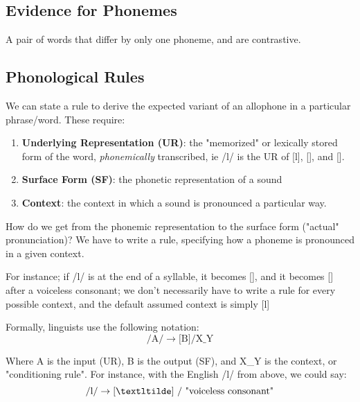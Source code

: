 \documentclass[12pt]{article}
\begin{document}
\subsection{Evidence for Phonemes}
\begin{definitionEnd}
  A pair of words that differ by only one phoneme, and are contrastive.
\end{definitionEnd}

\subsection{Phonological Rules}

We can state a rule to derive the expected variant of an allophone in a particular phrase/word. These require:
\begin{enumerate}
  \item \textbf{Underlying Representation (UR)}: the "memorized" or lexically stored form of the word, \textit{phonemically} transcribed, ie /l/ is the UR of [l], [\textltilde], and [].
  \item \textbf{Surface Form (SF)}: the phonetic representation of a sound
  \item \textbf{Context}: the context in which a sound is pronounced a particular way.
\end{enumerate}

How do we get from the phonemic representation to the surface form ("actual" pronunciation)? We have to write a rule, specifying how a phoneme is pronounced in a given context.

For instance; if /l/ is at the end of a syllable, it becomes [\textltilde], and it becomes [] after a voiceless consonant; we don't necessarily have to write a rule for every possible context, and the default assumed context is simply [l]

Formally, linguists use the following notation:
\[\text{/A/} \rightarrow \text{[B]} / \text{X\_Y}\]

Where A is the input (UR), B is the output (SF), and X\_Y is the context, or "conditioning rule". For instance, with the English /l/ from above, we could say:
\[\text{/l/}\rightarrow\text{[\textltilde] / \text{"voiceless consonant"}}\]
\end{document}
